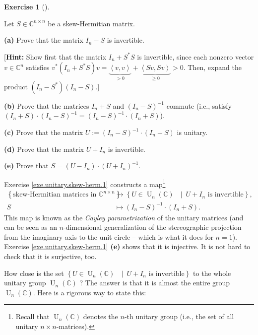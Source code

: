 \documentclass[numbers=enddot,12pt,final,onecolumn,notitlepage]{scrartcl}%
\newcounter{exer}
\numberwithin{exer}{subsection}
\theoremstyle{definition}
\newtheorem{exmp}[exer]{Exercise}
\newenvironment{exercise}[1][]
{\begin{exmp}[#1]\begin{leftbar}}
{\end{leftbar}\end{exmp}}
\begin{document}
\begin{exercise}
 \label{exe.unitary.skew-herm.1}Let $S\in\mathbb{C}^{n\times n}$ be a
skew-Hermitian matrix. \medskip

\textbf{(a)} Prove that the matrix $I_{n}-S$ is invertible. \medskip

[\textbf{Hint:} Show first that the matrix $I_{n}+S^{\ast}S$ is invertible,
since each nonzero vector $v\in\mathbb{C}^{n}$ satisfies $v^{\ast}\left(
I_{n}+S^{\ast}S\right)  v=\underbrace{\left\langle v,v\right\rangle }%
_{>0}+\underbrace{\left\langle Sv,Sv\right\rangle }_{\geq0}>0$. Then, expand
the product $\left(  I_{n}-S^{\ast}\right)  \left(  I_{n}-S\right)  $.]
\medskip

\textbf{(b)} Prove that the matrices $I_{n}+S$ and $\left(  I_{n}-S\right)
^{-1}$ commute (i.e., satisfy $\left(  I_{n}+S\right)  \cdot\left(
I_{n}-S\right)  ^{-1}=\left(  I_{n}-S\right)  ^{-1}\cdot\left(  I_{n}%
+S\right)  $). \medskip

\textbf{(c)} Prove that the matrix $U:=\left(  I_{n}-S\right)  ^{-1}%
\cdot\left(  I_{n}+S\right)  $ is unitary. \medskip

\textbf{(d)} Prove that the matrix $U+I_{n}$ is invertible. \medskip

\textbf{(e)} Prove that $S=\left(  U-I_{n}\right)  \cdot\left(  U+I_{n}%
\right)  ^{-1}$.
\end{exercise}

Exercise \ref{exe.unitary.skew-herm.1} constructs a map\footnote{Recall that
$\operatorname*{U}\nolimits_{n}\left(  \mathbb{C}\right)  $ denotes the $n$-th
unitary group (i.e., the set of all unitary $n\times n$-matrices).}%
\begin{align*}
\left\{  \text{skew-Hermitian matrices in }\mathbb{C}^{n\times n}\right\}   &
\rightarrow\left\{  U\in\operatorname*{U}\nolimits_{n}\left(  \mathbb{C}%
\right)  \text{ }\mid\ U+I_{n}\text{ is invertible}\right\}  ,\\
S  &  \mapsto\left(  I_{n}-S\right)  ^{-1}\cdot\left(  I_{n}+S\right)  .
\end{align*}
This map is known as the \emph{Cayley parametrization} of the unitary matrices
(and can be seen as an $n$-dimensional generalization of the stereographic
projection from the imaginary axis to the unit circle -- which is what it does
for $n=1$). Exercise \ref{exe.unitary.skew-herm.1} \textbf{(e)} shows that it
is injective. It is not hard to check that it is surjective, too.

How close is the set $\left\{  U\in\operatorname*{U}\nolimits_{n}\left(
\mathbb{C}\right)  \text{ }\mid\ U+I_{n}\text{ is invertible}\right\}  $ to
the whole unitary group $\operatorname*{U}\nolimits_{n}\left(  \mathbb{C}%
\right)  $ ? The answer is that it is almost the entire group
$\operatorname*{U}\nolimits_{n}\left(  \mathbb{C}\right)  $. Here is a
rigorous way to state this:
\end{document}
